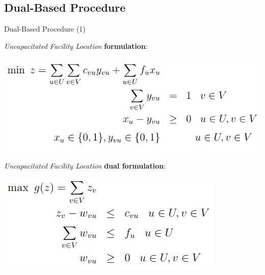 \documentclass{beamer}
\begin{document}
	    \subsection{Dual-Based Procedure}
	    \begin{frame}{Dual-Based Procedure (1)}
	    
	       \textit{Uncapacitated Facility Location} \textbf{formulation}:
	     
	     \begin{center}
	     \includegraphics[width=.8\textwidth]{img/algo_1.png}
	     \end{center}
	     
	     \textit{Uncapacitated Facility Location} \textbf{dual formulation}:
	     
	     \begin{center}
	     \includegraphics[width=.60\textwidth]{img/algo_2.png}
	     \end{center}
	    
	    \end{frame}
	    
\end{document}
